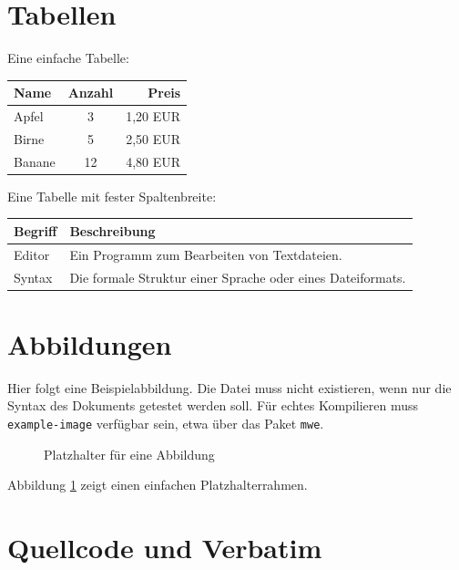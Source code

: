 \documentclass[a4paper,12pt]{article}
\begin{document}
	\section{Tabellen}

	Eine einfache Tabelle:

	\begin{center}
		\begin{tabular}{|l|c|r|}
			\hline
			Name & Anzahl & Preis \\
			\hline
			Apfel & 3 & 1,20 EUR \\
			Birne & 5 & 2,50 EUR \\
			Banane & 12 & 4,80 EUR \\
			\hline
		\end{tabular}
	\end{center}

	Eine Tabelle mit fester Spaltenbreite:

	\begin{center}
		\begin{tabular}{|p{4cm}|p{8cm}|}
			\hline
			Begriff & Beschreibung \\
			\hline
			Editor & Ein Programm zum Bearbeiten von Textdateien. \\
			\hline
			Syntax & Die formale Struktur einer Sprache oder eines Dateiformats. \\
			\hline
		\end{tabular}
	\end{center}

	\section{Abbildungen}

	Hier folgt eine Beispielabbildung. Die Datei muss nicht existieren, wenn nur
	die Syntax des Dokuments getestet werden soll. Für echtes Kompilieren muss
	\texttt{example-image} verfügbar sein, etwa über das Paket \texttt{mwe}.

	\begin{figure}[h]
		\centering
		\fbox{\rule{0pt}{4cm}\rule{6cm}{0pt}}
		\caption{Platzhalter für eine Abbildung}
		\label{fig:platzhalter}
	\end{figure}

	Abbildung \ref{fig:platzhalter} zeigt einen einfachen Platzhalterrahmen.

	\section{Quellcode und Verbatim}
\end{document}
